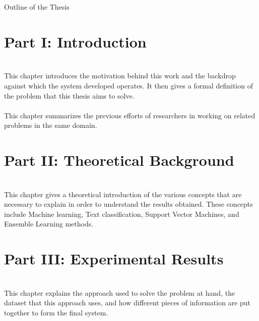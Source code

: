 \clearemptydoublepage

{}

\begin{center}
    \huge{Outline of the Thesis}
\end{center}

\section*{Part I: Introduction}

  \vspace{1mm}\\
\noindent This chapter introduces the motivation behind this work and the backdrop against which the system developed operates. It then gives a formal definition of the problem that this thesis aims to solve.\\

  \vspace{1mm}\\
\noindent This chapter summarizes the previous efforts of researchers in working on related problems in the same domain.\\

\section*{Part II: Theoretical Background}

  \vspace{1mm}\\
\noindent This chapter gives a theoretical introduction of the various concepts that are necessary to explain in order to understand the results obtained. These concepts include Machine learning, Text classification, Support Vector Machines, and Ensemble Learning methods.\\

\section*{Part III: Experimental Results}
  \vspace{1mm}\\
\noindent This chapter explains the approach used to solve the problem at hand, the dataset that this approach uses, and how different pieces of information are put together to form the final system.\\

